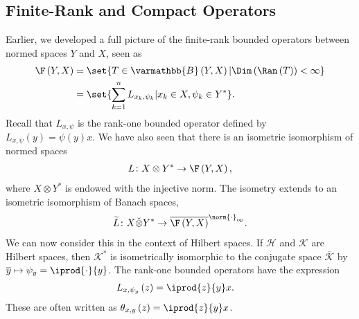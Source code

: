\documentclass[10pt]{mypackage}
\renewcommand*{\mathbb}[1]{\varmathbb{#1}}
\newcommand{\B}{\mathbb{B}}
\begin{document}
\subsection{Finite-Rank and Compact Operators}%
Earlier, we developed a full picture of the finite-rank bounded operators between normed spaces $Y$ and $X$, seen as
\begin{align*}
  \F\left(Y,X\right) &= \set{T\in \B\left(Y,X\right) | \Dim\left(\Ran\left(T\right)\right) < \infty}\\
                     &= \set{\sum_{k=1}^{n}L_{x_k,\psi_k} | x_k\in X,\psi_k\in Y^{\ast}}.
\end{align*}
Recall that $L_{x,\psi}$ is the rank-one bounded operator defined by $L_{x,\psi}\left(y\right) = \psi(y)x$. We have also seen that there is an isometric isomorphism of normed spaces
\begin{align*}
  L\colon X\otimes Y^{\ast}\rightarrow \F\left(Y,X\right),
\end{align*}
where $X\otimes Y^{\ast}$ is endowed with the injective norm. The isometry extends to an isometric isomorphism of Banach spaces,
\begin{align*}
  \widetilde{L}\colon X\check{\otimes}Y^{\ast} \rightarrow \overline{\F\left(Y,X\right)}^{\norm{\cdot}_{\text{op}}}.
\end{align*}
We can now consider this in the context of Hilbert spaces. If $\mathcal{H}$ and $\mathcal{K}$ are Hilbert spaces, then $\mathcal{K}^{\ast}$ is isometrically isomorphic to the conjugate space $\overline{\mathcal{K}}$ by $\overline{y} \mapsto \psi_y = \iprod{\cdot}{y}$. The rank-one bounded operators have the expression
\begin{align*}
  L_{x,\psi_y}\left(z\right) &= \iprod{z}{y}x.
\end{align*}
These are often written as $\theta_{x,y}\left(z\right) = \iprod{z}{y}x$.
\end{document}
